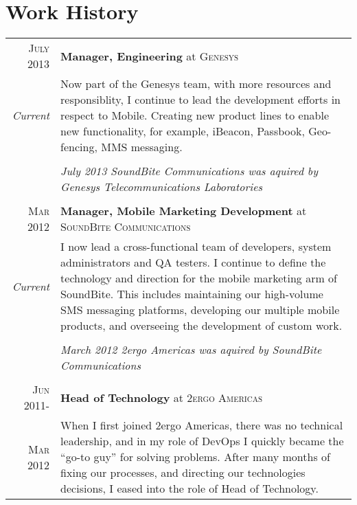 \documentclass[letterpaper,10pt]{article}
\begin{document}
\section{Work History}
\begin{tabularx}{\textwidth}{r|X}


\textsc{July 2013} & \textbf{Manager, Engineering} at \textsc{Genesys} \\
 \emph{Current}    & Now part of the Genesys team, with more resources and responsiblity, I continue to lead the development efforts in respect to Mobile. Creating new product lines to enable new functionality, for example, iBeacon, Passbook, Geo-fencing, MMS messaging. \\

&\\
& \it{July 2013 SoundBite Communications was aquired by Genesys Telecommunications Laboratories} \\
&\\

 \textsc{Mar 2012} & \textbf{Manager, Mobile Marketing Development} at \textsc{SoundBite Communications} \\
 \emph{Current}     & I now lead a cross-functional team of developers, system administrators and QA testers. I continue to define
			the technology and direction for the mobile marketing arm of SoundBite. This includes maintaining our high-volume
			SMS messaging platforms, developing our multiple mobile products, and overseeing the development of custom work.\\

&\\
& \it{March 2012 2ergo Americas was aquired by SoundBite Communications} \\
&\\
 \textsc{Jun 2011-} & \textbf{Head of Technology} at \textsc{2ergo Americas} \\
 \textsc{Mar 2012}  & When I first joined 2ergo Americas, there was no technical leadership, and in my role of DevOps
			I quickly became the ``go-to guy'' for solving problems. After many months of fixing our processes, and directing our technologies decisions, I eased into the role of Head of Technology.


\end{tabularx}
\end{document}
